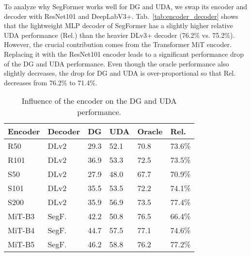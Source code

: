 \documentclass[journal,compsoc]{IEEEtran}
\begin{document}
To analyze why SegFormer works well for DG and UDA, we swap its encoder and decoder with ResNet101 and DeepLabV3+.
Tab.~\ref{tab:encoder_decoder} shows that the lightweight MLP decoder of SegFormer has a slightly higher relative UDA performance (Rel.) than the heavier DLv3+ decoder (76.2\% vs. 75.2\%). However, the crucial contribution comes from the Transformer MiT encoder. Replacing it with the ResNet101 encoder leads to a significant performance drop of the DG and UDA performance. Even though the oracle performance also slightly decreases,
the drop for DG and UDA is over-proportional so that Rel. decreases from 76.2\% to 71.4\%.

\begin{table}
\centering
\caption{Influence of the encoder on the DG and UDA performance.}
\label{tab:encoder_size}
\footnotesize
\begin{tabular}{llllll}
\toprule
Encoder & Decoder &       DG &           UDA &         Oracle &   Rel. \\
\midrule
    R50~\cite{he2016deep} &    DLv2~\cite{chen2017deeplab} &     29.3 & 52.1 &   70.8 & 73.6\% \\
    R101~\cite{he2016deep} &    DLv2~\cite{chen2017deeplab} &     36.9 & 53.3 &   72.5 & 73.5\% \\
    S50~\cite{zhang2020resnest} &    DLv2~\cite{chen2017deeplab} &     27.9 & 48.0 &   67.7 & 70.9\% \\
    S101~\cite{zhang2020resnest} &    DLv2~\cite{chen2017deeplab} &     35.5 & 53.5 &   72.2 & 74.1\% \\
    S200~\cite{zhang2020resnest} &    DLv2~\cite{chen2017deeplab} &     35.9 & 56.9 &   73.5 & 77.4\% \\
    MiT-B3~\cite{xie2021segformer} &   SegF.~\cite{xie2021segformer} &     42.2 & 50.8 &   76.5 & 66.4\% \\
    MiT-B4~\cite{xie2021segformer} &   SegF.~\cite{xie2021segformer} &     44.7 & 57.5 &   77.1 & 74.6\% \\
    MiT-B5~\cite{xie2021segformer} &   SegF.~\cite{xie2021segformer} &     46.2 & 58.8 &   76.2 & 77.2\% \\
\bottomrule
\end{tabular}
\end{table} 
\end{document}
